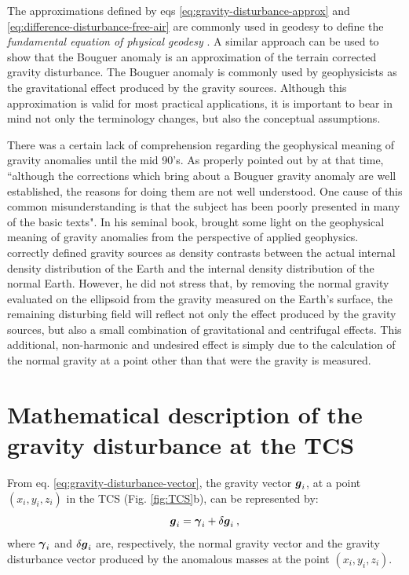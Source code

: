 \documentclass[extra]{gji}
\begin{document}
The approximations defined by eqs \ref{eq:gravity-disturbance-approx}
and \ref{eq:difference-disturbance-free-air} are commonly used
in geodesy to define the \textit{fundamental equation of physical
geodesy} \citep{hofmann-wellenhof-moritz2005}.
A similar approach can be used to show that the Bouguer anomaly
is an approximation of the terrain corrected gravity disturbance.
The Bouguer anomaly is commonly used by geophysicists as the
gravitational effect produced by the gravity sources.
Although this approximation is valid for most practical applications,
it is important to bear in mind not only the terminology 
changes, but also the conceptual assumptions.

There was a certain lack of comprehension regarding the
geophysical meaning of gravity anomalies until the
mid 90's.
As properly pointed out by \citet{chapin1996} at that time, 
``although the corrections which bring about a Bouguer 
gravity anomaly are well established, the reasons for doing
them are not well understood. One cause of this common 
misunderstanding is that the subject has been poorly presented in
many of the basic texts".
In his seminal book, \citet{blakely1996} brought some light
on the geophysical meaning of gravity anomalies from the 
perspective of applied geophysics. \citet{blakely1996} correctly
defined gravity sources as density contrasts between the actual
internal density distribution of the Earth and the internal density
distribution of the normal Earth.
However, he did not stress that, by removing the normal gravity 
evaluated on the ellipsoid from the gravity measured 
on the Earth's surface, the remaining disturbing field will reflect 
not only the effect produced by the gravity sources, but also a
small combination of gravitational and centrifugal effects.
This additional, non-harmonic and undesired effect is 
simply due to the calculation of the normal gravity at a point
other than that were the gravity is measured.


\section{Mathematical description of the gravity disturbance at the TCS}

From eq. \ref{eq:gravity-disturbance-vector}, the gravity vector $\mitbf{g}_{i}$, at a point 
$(x_{i}, y_{i}, z_{i})$ in the TCS (Fig. \ref{fig:TCS}b), can be represented by:
\begin{equation}
\mitbf{g}_{i} = \mitbf{\gamma}_{i} + \delta \mitbf{g}_{i} \: ,
\label{eq:gravity-vector-TCS}
\end{equation}
where $\mitbf{\gamma}_{i}$ and $\delta \mitbf{g}_{i}$
are, respectively, the normal gravity vector and the 
gravity disturbance vector produced by the anomalous 
masses at the point $(x_{i}, y_{i}, z_{i})$.
\end{document}
